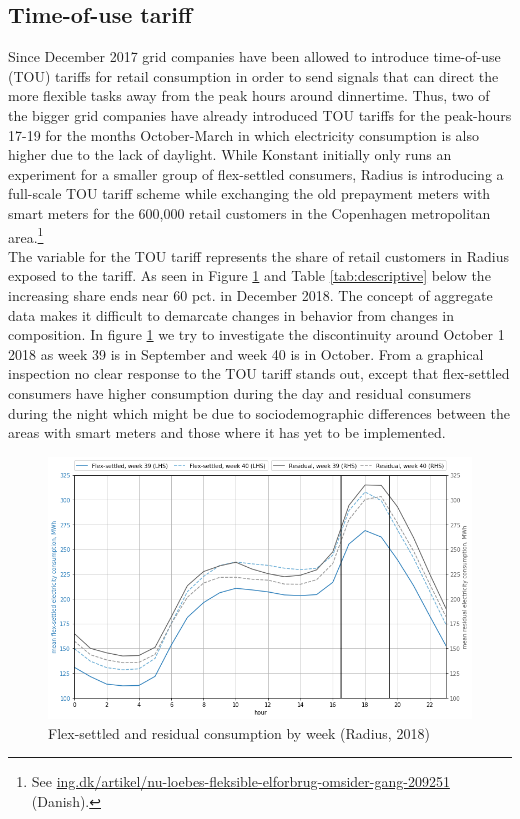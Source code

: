 \subsection{Time-of-use tariff}
\label{subsec:d_tout}
Since December 2017 grid companies have been allowed to introduce time-of-use (TOU) tariffs for retail consumption in order to send signals that can direct the more flexible tasks away from the peak hours around dinnertime. Thus, two of the bigger grid companies have already introduced TOU tariffs for the peak-hours 17-19 for the months October-March in which electricity consumption is also higher due to the lack of daylight. While Konstant initially only runs an experiment for a smaller group of flex-settled consumers, Radius is introducing a full-scale TOU tariff scheme while exchanging the old prepayment meters with smart meters for the 600,000 retail customers in the Copenhagen metropolitan area.\footnote{See \href{https://ing.dk/artikel/nu-loebes-fleksible-elforbrug-omsider-gang-209251}{ing.dk/artikel/nu-loebes-fleksible-elforbrug-omsider-gang-209251} (Danish).}
\medskip\\
The variable for the TOU tariff represents the share of retail customers in Radius exposed to the tariff. As seen in Figure \ref{fig:radius_w39_w40} and Table \ref{tab:descriptive} below the increasing share ends near 60 pct. in December 2018. The concept of aggregate data makes it difficult to demarcate changes in behavior from changes in composition. In figure \ref{fig:radius_w39_w40} we try to investigate the discontinuity around October 1 2018 as week 39 is in September and week 40 is in October. From a graphical inspection no clear response to the TOU tariff stands out, except that flex-settled consumers have higher consumption during the day and residual consumers during the night which might be due to sociodemographic differences between the areas with smart meters and those where it has yet to be implemented.
\begin{figure}[H]
  \centering
  \caption{Flex-settled and residual consumption by week (Radius, 2018)}
  \label{fig:radius_w39_w40}
      \includegraphics[width=1 \textwidth]{03_figures/radius_w39_w40}
\end{figure}

